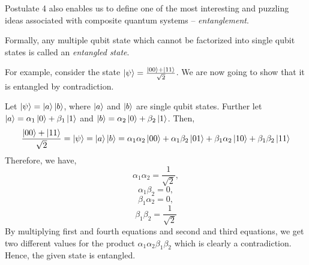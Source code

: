Postulate 4 also enables us to define one of the most interesting and puzzling ideas associated with composite quantum systems – \textit{entanglement}.
\vspace{1em}

Formally, any multiple qubit state which cannot be factorized into single qubit states is called an \textit{entangled state}.
\vspace{1em}

For example, consider the state $\ket{\psi} = \frac{\ket{00} + \ket{11}}{\sqrt{2}}$. We are now going to show that it is entangled by contradiction.
\vspace{1em}

Let $\ket{\psi} = \ket{a}\ket{b}$, where $\ket{a}$ and $\ket{b}$ are single qubit states.
Further let $\ket{a} = \alpha_1\ket{0} + \beta_1\ket{1}$ and $\ket{b} = \alpha_2\ket{0} + \beta_2\ket{1}$.
Then,
    $$\frac{\ket{00} + \ket{11}}{\sqrt{2}} = \ket{\psi} = \ket{a}\ket{b} = \alpha_1\alpha_2\ket{00} + \alpha_1\beta_2\ket{01} + \beta_1\alpha_2\ket{10} + \beta_1\beta_2\ket{11}$$
Therefore, we have,
    $$\alpha_1\alpha_2 = \frac{1}{\sqrt{2}},$$
    $$\alpha_1\beta_2 = 0,$$
    $$\beta_1\alpha_2 = 0,$$
    $$\beta_1\beta_2 = \frac{1}{\sqrt{2}}$$
By multiplying first and fourth equations and second and third equations, we get two different values for the product $\alpha_1\alpha_2\beta_1\beta_2$ which is clearly a contradiction. Hence, the given state is entangled.
\vspace{1em}